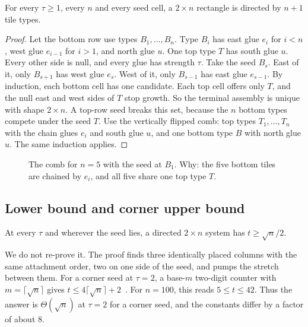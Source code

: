 \documentclass[10pt]{hackr26}
\begin{document}
\begin{theorem}\label{thm:comb}
For every $\tau\ge1$, every $n$ and every seed cell, a $2\times n$ rectangle is directed by $n+1$ tile types.
\end{theorem}
\begin{proof}
Let the bottom row use types $B_1,\dots,B_n$.
Type $B_i$ has east glue $e_i$ for $i<n$, west glue $e_{i-1}$ for $i>1$, and north glue $u$.
One top type $T$ has south glue $u$.
Every other side is null, and every glue has strength $\tau$.
Take the seed $B_s$.
East of it, only $B_{s+1}$ has west glue $e_s$.
West of it, only $B_{s-1}$ has east glue $e_{s-1}$.
By induction, each bottom cell has one candidate.
Each top cell offers only $T$, and the null east and west sides of $T$ stop growth.
So the terminal assembly is unique with shape $2\times n$.
A top-row seed breaks this set, because the $n$ bottom types compete under the seed $T$.
Use the vertically flipped comb: top types $T_1,\dots,T_n$ with the chain glues $e_i$ and south glue $u$, and one bottom type $B$ with north glue $u$.
The same induction applies.
\end{proof}

\begin{figure}[H]
\centering
{}
\caption{The comb for $n=5$ with the seed at $B_1$. Why: the five bottom tiles are chained by $e_i$, and all five share one top type $T$.}
\label{fig:comb}
\end{figure}

\subsection{Lower bound and corner upper bound}

\begin{theorem}\label{thm:lower}
At every $\tau$ and wherever the seed lies, a directed $2\times n$ system has $t\ge\sqrt n/2$.
\end{theorem}
We do not re-prove it.
The proof finds three identically placed columns with the same attachment order, two on one side of the seed, and pumps the stretch between them.
For a corner seed at $\tau=2$, a base-$m$ two-digit counter with $m=\lceil\sqrt n\rceil$ gives $t\le4\lceil\sqrt n\rceil+2$~\cite{ACG05}.
For $n=100$, this reads $5\le t\le42$.
Thus the answer is $\Theta(\sqrt n)$ at $\tau=2$ for a corner seed, and the constants differ by a factor of about 8.
\end{document}
